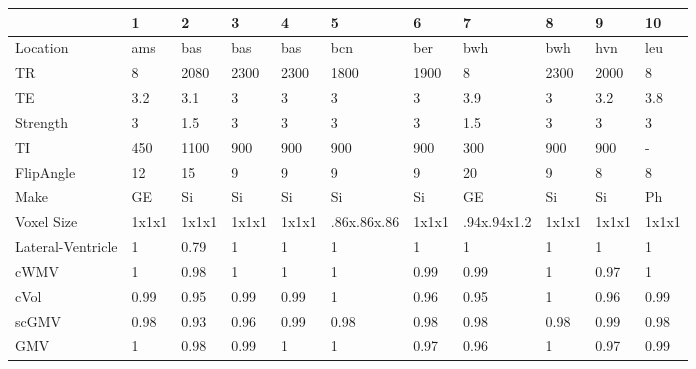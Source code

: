 \begin{table}
[]
\centering
\begin{tabular}{lllllllllll}
\toprule
{} &     1  &     2  &     3  &     4  &                    5  &     6  &                    7  &     8  &     9  &     10 \\
\midrule
Location & ams & bas & bas & bas & bcn & ber & bwh & bwh & hvn & leu\\
\midrule
TR                            &      8 &   2080 &   2300 &   2300 &                  1800 &   1900 &                     8 &   2300 &   2000 &      8 \\
TE                            &    3.2 &    3.1 &      3 &      3 &                     3 &      3 &                   3.9 &      3 &    3.2 &    3.8 \\
Strength                      &      3 &    1.5 &      3 &      3 &                     3 &      3 &                   1.5 &      3 &      3 &      3 \\
TI                            &    450 &   1100 &    900 &    900 &                   900 &    900 &                   300 &    900 &    900 &      - \\
FlipAngle                     &     12 &     15 &      9 &      9 &                     9 &      9 &                    20 &      9 &      8 &      8 \\
Make                          &     GE &     Si &     Si &     Si &                    Si &     Si &                    GE &     Si &     Si &     Ph \\
Voxel Size                    &  1x1x1 &  1x1x1 &  1x1x1 &  1x1x1 &  .86x.86x.86 &  1x1x1 &  .94x.94x1.2 &  1x1x1 &  1x1x1 &  1x1x1 \\
\midrule
Lateral-Ventricle             &      1 &   0.79 &      1 &      1 &                     1 &      1 &                     1 &      1 &      1 &      1 \\
cWMV        &      1 &   0.98 &      1 &      1 &                     1 &   0.99 &                  0.99 &      1 &   0.97 &      1 \\
cVol                   &   0.99 &   0.95 &   0.99 &   0.99 &                     1 &   0.96 &                  0.95 &      1 &   0.96 &   0.99 \\
scGMV                &   0.98 &   0.93 &   0.96 &   0.99 &                  0.98 &   0.98 &                  0.98 &   0.98 &   0.99 &   0.98 \\
GMV                  &      1 &   0.98 &   0.99 &      1 &                     1 &   0.97 &                  0.96 &      1 &   0.97 &   0.99 \\

\end{tabular}
\end{table}
